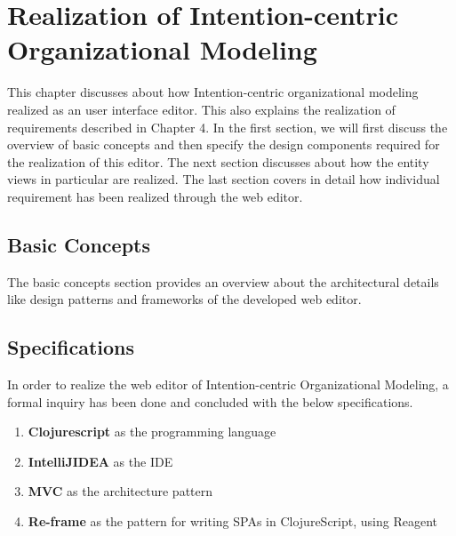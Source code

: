 \chapter{Realization of Intention-centric Organizational Modeling}
\label{chap:realization}

\hspace{4ex} This chapter discusses about how Intention-centric organizational modeling realized as an user interface editor. This also explains the realization of requirements described in Chapter 4. In the first section, we will first discuss the overview of basic concepts and then specify the design components required for the realization of this editor. The next section discusses about how the entity views in particular are realized. The last section covers in detail how individual requirement has been realized through the web editor.


\section{Basic Concepts}
\label{sec:basicconcepts}
\hspace{4ex} The basic concepts section provides an overview about the architectural details like design patterns and frameworks of the developed web editor.


\section{Specifications}
\label{sec:specifications}
In order to realize the web editor of Intention-centric Organizational Modeling, a formal inquiry has been done and concluded with the below specifications.

\begin{enumerate}   
	\item \textbf{Clojurescript} as the programming language
	\item \textbf{IntelliJIDEA} as the IDE
	\item \textbf{MVC} as the architecture pattern
	\item \textbf{Re-frame} as the pattern for writing SPAs in ClojureScript, using Reagent	
\end{enumerate}

